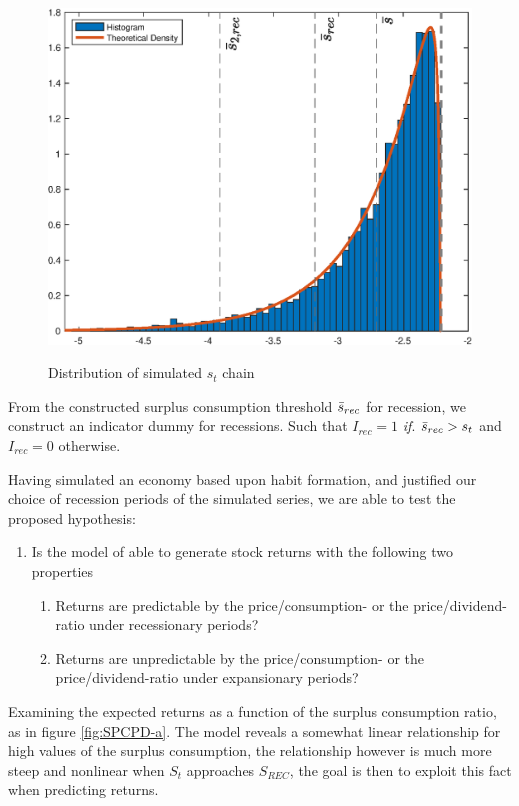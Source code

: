 \begin{figure}[H]
    \centering
    \caption{Distribution of simulated $s_t$ chain}
    \includegraphics[width=\textwidth]{Figures/DistributionS_t.eps}
    \label{fig:DistriSt}
\end{figure}
From the constructed surplus consumption threshold $\Bar{s}_{rec}$ for recession, we construct an indicator dummy for recessions. Such that $I_{rec} = 1$ \textit{if}. $\Bar{s}_{rec} > s_t$ and $I_{rec}=0$ otherwise.

Having simulated an economy based upon habit formation, and justified our choice of recession periods of the simulated series, we are able to test the proposed hypothesis:
\begin{enumerate}
    \item Is the model of \citet{Campbell1999} able to generate stock returns with the following two properties
    \begin{enumerate}
        \item Returns are predictable by the price/consumption- or the price/dividend-ratio under recessionary periods?
        \item Returns are unpredictable by the price/consumption- or the price/dividend-ratio under expansionary periods?
    \end{enumerate}
\end{enumerate}
Examining the expected returns as a function of the surplus consumption ratio, as in figure \ref{fig:SPCPD-a}. The model reveals a somewhat linear relationship for high values of the surplus consumption, the relationship however is much more steep and nonlinear when $S_t$ approaches ${S}_{REC}$, the goal is then to exploit this fact when predicting returns.



